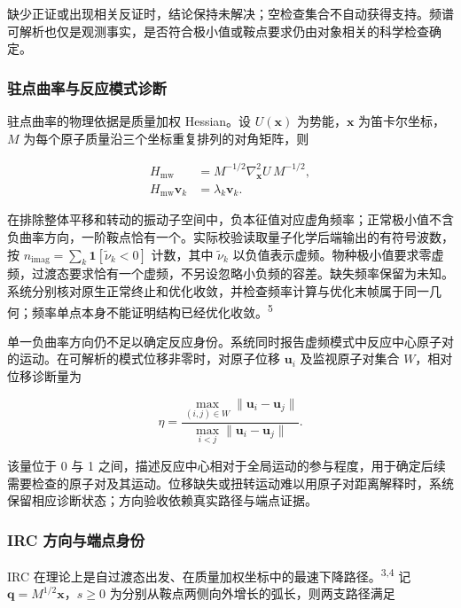 缺少正证或出现相关反证时，结论保持未解决；空检查集合不自动获得支持。频谱可解析也仅是观测事实，是否符合极小值或鞍点要求仍由对象相关的科学检查确定。

\subsubsection{驻点曲率与反应模式诊断}

驻点曲率的物理依据是质量加权 Hessian。设 $U(\mathbf x)$ 为势能，$\mathbf x$ 为笛卡尔坐标，$M$ 为每个原子质量沿三个坐标重复排列的对角矩阵，则

\begin{equation}\label{eq:methods-10}
\begin{aligned}
H_{\mathrm{mw}}&=M^{-1/2}\nabla_{\mathbf x}^{2}U\,M^{-1/2},\\
H_{\mathrm{mw}}\mathbf v_k&=\lambda_k\mathbf v_k.
\end{aligned}
\end{equation}

在排除整体平移和转动的振动子空间中，负本征值对应虚角频率；正常极小值不含负曲率方向，一阶鞍点恰有一个。实际校验读取量子化学后端输出的有符号波数，按 $n_{\mathrm{imag}}=\sum_k\mathbf 1[\tilde\nu_k<0]$ 计数，其中 $\tilde\nu_k$ 以负值表示虚频。物种极小值要求零虚频，过渡态要求恰有一个虚频，不另设忽略小负频的容差。缺失频率保留为未知。系统分别核对原生正常终止和优化收敛，并检查频率计算与优化末帧属于同一几何；频率单点本身不能证明结构已经优化收敛。\textsuperscript{5}

单一负曲率方向仍不足以确定反应身份。系统同时报告虚频模式中反应中心原子对的运动。在可解析的模式位移非零时，对原子位移 $\mathbf u_i$ 及监视原子对集合 $W$，相对位移诊断量为

\begin{equation}\label{eq:methods-11}
\eta=\frac{\max_{(i,j)\in W}\|\mathbf u_i-\mathbf u_j\|}
{\max_{i<j}\|\mathbf u_i-\mathbf u_j\|}.
\end{equation}

该量位于 0 与 1 之间，描述反应中心相对于全局运动的参与程度，用于确定后续需要检查的原子对及其运动。位移缺失或扭转运动难以用原子对距离解释时，系统保留相应诊断状态；方向验收依赖真实路径与端点证据。

\subsubsection{IRC 方向与端点身份}

IRC 在理论上是自过渡态出发、在质量加权坐标中的最速下降路径。\textsuperscript{3,4} 记 $\mathbf q=M^{1/2}\mathbf x$，$s\ge0$ 为分别从鞍点两侧向外增长的弧长，则两支路径满足

